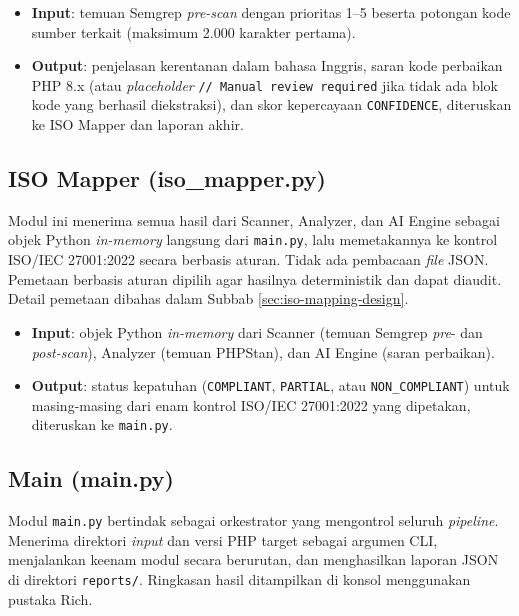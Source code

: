 \begin{itemize}
    \item \textbf{Input}: temuan Semgrep \textit{pre-scan} dengan prioritas 1--5 beserta potongan kode sumber terkait (maksimum 2.000 karakter pertama).
    \item \textbf{Output}: penjelasan kerentanan dalam bahasa Inggris, saran kode perbaikan PHP 8.x (atau \textit{placeholder} \texttt{// Manual review required} jika tidak ada blok kode yang berhasil diekstraksi), dan skor kepercayaan \texttt{CONFIDENCE}, diteruskan ke ISO Mapper dan laporan akhir.
\end{itemize}

\subsection{ISO Mapper (iso\_mapper.py)}

Modul ini menerima semua hasil dari Scanner, Analyzer, dan AI Engine sebagai objek Python \textit{in-memory} langsung dari \texttt{main.py}, lalu memetakannya ke kontrol ISO/IEC 27001:2022 secara berbasis aturan. Tidak ada pembacaan \textit{file} JSON. Pemetaan berbasis aturan dipilih agar hasilnya deterministik dan dapat diaudit. Detail pemetaan dibahas dalam Subbab \ref{sec:iso-mapping-design}.

\begin{itemize}
    \item \textbf{Input}: objek Python \textit{in-memory} dari Scanner (temuan Semgrep \textit{pre}- dan \textit{post-scan}), Analyzer (temuan PHPStan), dan AI Engine (saran perbaikan).
    \item \textbf{Output}: status kepatuhan (\texttt{COMPLIANT}, \texttt{PARTIAL}, atau \texttt{NON\_COMPLIANT}) untuk masing-masing dari enam kontrol ISO/IEC 27001:2022 yang dipetakan, diteruskan ke \texttt{main.py}.
\end{itemize}

\subsection{Main (main.py)}

Modul \texttt{main.py} bertindak sebagai orkestrator yang mengontrol seluruh \textit{pipeline}. Menerima direktori \textit{input} dan versi PHP target sebagai argumen CLI, menjalankan keenam modul secara berurutan, dan menghasilkan laporan JSON di direktori \texttt{reports/}. Ringkasan hasil ditampilkan di konsol menggunakan pustaka Rich.

